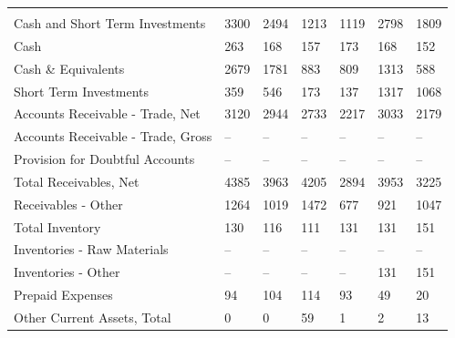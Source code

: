 \documentclass[grad,numbers]{coppe}
\begin{document}
\begin{longtable}[t]{lllllll}
  \endfoot
  \bottomrule
  \endlastfoot
  \addlinespace[0.3em]
  \multicolumn{7}{l}{\textbf{Assets}}\\
  \hspace{1em}Cash and Short Term Investments & 3300 & 2494 & 1213 & 1119 & 2798 & 1809\\
  \hspace{1em}\hspace{1em}Cash & 263 & 168 & 157 & 173 & 168 & 152\\
  \hspace{1em}\hspace{1em}Cash \& Equivalents & 2679 & 1781 & 883 & 809 & 1313 & 588\\
  \hspace{1em}\hspace{1em}Short Term Investments & 359 & 546 & 173 & 137 & 1317 & 1068\\
  \hspace{1em}Accounts Receivable - Trade, Net & 3120 & 2944 & 2733 & 2217 & 3033 & 2179\\
  \hspace{1em}\hspace{1em}Accounts Receivable - Trade, Gross & -- & -- & -- & -- & -- & --\\
  \hspace{1em}\hspace{1em}Provision for Doubtful Accounts & -- & -- & -- & -- & -- & --\\
  \hspace{1em}Total Receivables, Net & 4385 & 3963 & 4205 & 2894 & 3953 & 3225\\
  \hspace{1em}\hspace{1em}Receivables - Other & 1264 & 1019 & 1472 & 677 & 921 & 1047\\
  \hspace{1em}Total Inventory & 130 & 116 & 111 & 131 & 131 & 151\\
  \hspace{1em}\hspace{1em}Inventories - Raw Materials & -- & -- & -- & -- & -- & --\\
  \hspace{1em}\hspace{1em}Inventories - Other & -- & -- & -- & -- & 131 & 151\\
  \hspace{1em}Prepaid Expenses & 94 & 104 & 114 & 93 & 49 & 20\\
  \hspace{1em}Other Current Assets, Total & 0 & 0 & 59 & 1 & 2 & 13\\

\end{longtable}
\end{document}
